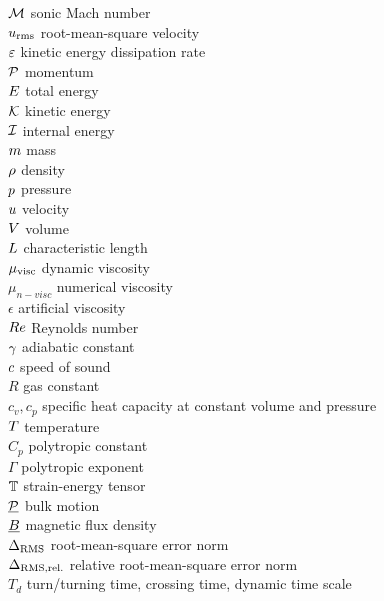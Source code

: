 \begin{tabbing}
$\mathcal{M}$         \> sonic Mach number \\
$u_{\text{rms}}$         \> root-mean-square velocity \\
$\varepsilon$     \> kinetic energy dissipation rate \\
$\mathcal{P}$          \> momentum \\
$E$         \> total energy \\
$\mathcal{K}$         \> kinetic energy \\
$\mathcal{I}$         \> internal energy \\
$m$         \> mass \\
$\rho$         \> density \\
$p$         \> pressure \\
$u$         \> velocity \\
$V$          \> volume \\
$L$         \> characteristic length \\
$\mu_{\text{visc}}$         \> dynamic viscosity \\
$\mu_{n-visc}$  \> numerical viscosity \\
$\epsilon$      \> artificial viscosity \\
$Re$      \> Reynolds number \\
$\gamma$   \> adiabatic constant \\
$c$      \> speed of sound \\
$R$             \> gas constant \\
$c_v, c_p$      \> specific heat capacity at constant volume and pressure \\
$T$         \> temperature \\
$C_p$           \> polytropic constant \\
$\Gamma$        \> polytropic exponent \\
$\mathbb{T}$          \> strain-energy tensor \\
$\underline{\mathcal{P}}$         \> bulk motion \\
$\underline{B}$     \> magnetic flux density \\
$\Delta_{\text{RMS}}$     \> root-mean-square error norm \\
$\Delta_{\text{RMS,rel.}}$  \> relative root-mean-square error norm \\
$T_d$           \> turn/turning time, crossing time, dynamic time scale \\

\end{tabbing}
